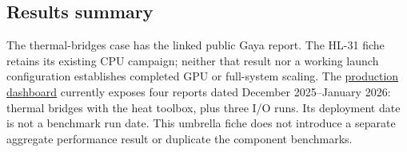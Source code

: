 \subsection{Results summary}
The thermal-bridges case has the linked public Gaya report. The HL-31 fiche
retains its existing CPU campaign; neither that result nor a working launch
configuration establishes completed GPU or full-system scaling.
The \href{https://numpex.github.io/apps-feelpp/apps-feelpp/index.html}{production dashboard}
currently exposes four reports dated December 2025--January 2026: thermal
bridges with the heat toolbox, plus three I/O runs. Its deployment date is
not a benchmark run date. This umbrella fiche does not introduce a separate
aggregate performance result or duplicate the component benchmarks.


